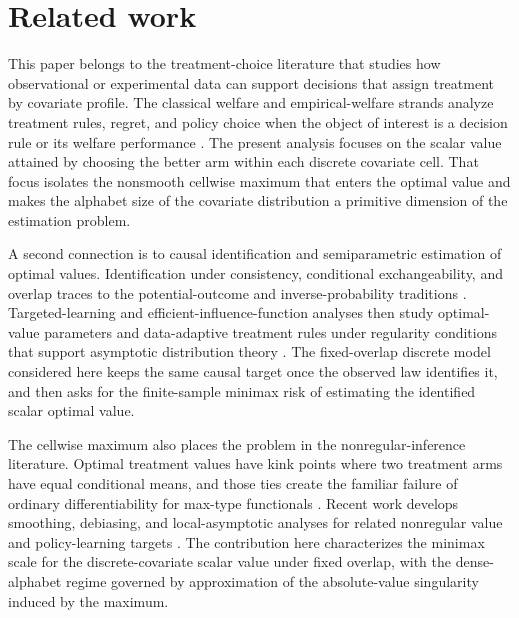 \section{Related work}

This paper belongs to the treatment-choice literature that studies how observational or experimental data can support decisions that assign treatment by covariate profile. The classical welfare and empirical-welfare strands analyze treatment rules, regret, and policy choice when the object of interest is a decision rule or its welfare performance \citep{Manski2004,Murphy2003,Hirano2009,Kitagawa2018,Qian2011,Athey2021}. The present analysis focuses on the scalar value attained by choosing the better arm within each discrete covariate cell. That focus isolates the nonsmooth cellwise maximum that enters the optimal value and makes the alphabet size of the covariate distribution a primitive dimension of the estimation problem.

A second connection is to causal identification and semiparametric estimation of optimal values. Identification under consistency, conditional exchangeability, and overlap traces to the potential-outcome and inverse-probability traditions \citep{Robins1986,Rosenbaum1983}. Targeted-learning and efficient-influence-function analyses then study optimal-value parameters and data-adaptive treatment rules under regularity conditions that support asymptotic distribution theory \citep{vanDerLaan2015,LuedtkeVanderLaan2016OptimalValue}. The fixed-overlap discrete model considered here keeps the same causal target once the observed law identifies it, and then asks for the finite-sample minimax risk of estimating the identified scalar optimal value.

The cellwise maximum also places the problem in the nonregular-inference literature. Optimal treatment values have kink points where two treatment arms have equal conditional means, and those ties create the familiar failure of ordinary differentiability for max-type functionals \citep{Chakraborty2010,Hirano2012}. Recent work develops smoothing, debiasing, and local-asymptotic analyses for related nonregular value and policy-learning targets \citep{Chen2023,WhitehouseChenAusternSyrgkanis2025,Wei2025}. The contribution here characterizes the minimax scale for the discrete-covariate scalar value under fixed overlap, with the dense-alphabet regime governed by approximation of the absolute-value singularity induced by the maximum.

